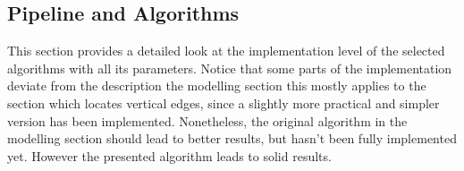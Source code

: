 \subsection{Pipeline and Algorithms}\label{subsec:pipeline}

This section provides a detailed look at the implementation level of the selected algorithms
with all its parameters.
Notice that some parts of the implementation deviate from the description the modelling section
this mostly applies to the section which locates vertical edges, since a slightly more practical
and simpler version has been implemented. Nonetheless, the original algorithm in the modelling
section should lead to better results, but hasn't been fully implemented yet.
However the presented algorithm leads to solid results.




